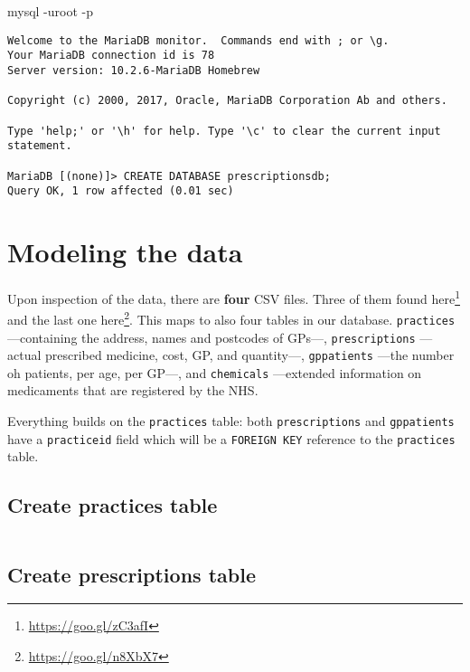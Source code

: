 \documentclass[english,a4paper,]{report}
\newenvironment{Shaded}{}{}
\newcommand{\ExtensionTok}[1]{#1}
\newcommand{\NormalTok}[1]{#1}
\renewcommand{\href}[2]{#2\footnote{\url{#1}}}
\begin{document}
\begin{Shaded}
\begin{Highlighting}[]
\ExtensionTok{mysql}\NormalTok{ -uroot -p}
\end{Highlighting}
\end{Shaded}

\begin{verbatim}
Welcome to the MariaDB monitor.  Commands end with ; or \g.
Your MariaDB connection id is 78
Server version: 10.2.6-MariaDB Homebrew

Copyright (c) 2000, 2017, Oracle, MariaDB Corporation Ab and others.

Type 'help;' or '\h' for help. Type '\c' to clear the current input statement.

MariaDB [(none)]> CREATE DATABASE prescriptionsdb;
Query OK, 1 row affected (0.01 sec)
\end{verbatim}

\section{Modeling the data}\label{modeling-the-data}

Upon inspection of the data, there are \textbf{four} CSV files. Three of
them found \href{https://goo.gl/zC3afI}{here} and the last one
\href{https://goo.gl/n8XbX7}{here}. This maps to also four tables in our
database. \texttt{practices} ---containing the address, names and
postcodes of GPs---, \texttt{prescriptions} ---actual prescribed
medicine, cost, GP, and quantity---, \texttt{gppatients} ---the number
oh patients, per age, per GP---, and \texttt{chemicals} ---extended
information on medicaments that are registered by the NHS.

Everything builds on the \texttt{practices} table: both
\texttt{prescriptions} and \texttt{gppatients} have a
\texttt{practiceid} field which will be a \texttt{FOREIGN\ KEY}
reference to the \texttt{practices} table.

\subsection{Create practices table}\label{create-practices-table}

\inputminted[firstline=10,lastline=19]{sql}{src/sql/00-setup.sql}

\subsection{Create prescriptions
table}\label{create-prescriptions-table}
\end{document}
